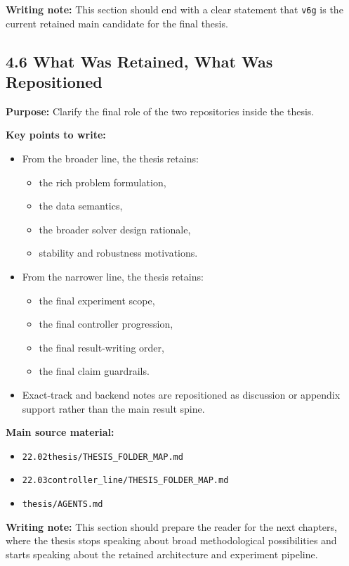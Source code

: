 \textbf{Writing note:} This section should end with a clear statement that \texttt{v6g} is the current retained main candidate for the final thesis.

\subsection*{4.6 What Was Retained, What Was Repositioned}
\textbf{Purpose:} Clarify the final role of the two repositories inside the thesis.

\textbf{Key points to write:}
\begin{itemize}
    \item From the broader line, the thesis retains:
    \begin{itemize}
        \item the rich problem formulation,
        \item the data semantics,
        \item the broader solver design rationale,
        \item stability and robustness motivations.
    \end{itemize}
    \item From the narrower line, the thesis retains:
    \begin{itemize}
        \item the final experiment scope,
        \item the final controller progression,
        \item the final result-writing order,
        \item the final claim guardrails.
    \end{itemize}
    \item Exact-track and backend notes are repositioned as discussion or appendix support rather than the main result spine.
\end{itemize}

\textbf{Main source material:}
\begin{itemize}
    \item \texttt{22.02thesis/THESIS\_FOLDER\_MAP.md}
    \item \texttt{22.03controller_line/THESIS\_FOLDER\_MAP.md}
    \item \texttt{thesis/AGENTS.md}
\end{itemize}

\textbf{Writing note:} This section should prepare the reader for the next chapters, where the thesis stops speaking about broad methodological possibilities and starts speaking about the retained architecture and experiment pipeline.

